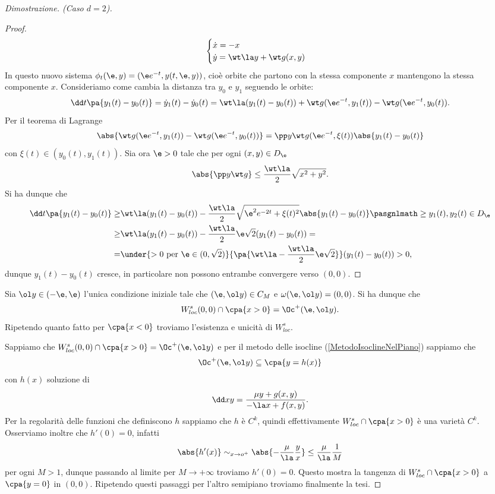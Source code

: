 \begin{proof}[Dimostrazione. (Caso $d=2$)]
\begin{proof}
\[\begin{cases}
\dot x=-x\\
\dot y=\wt \la y+\wt g(x,y)
\end{cases}\]
In questo nuovo sistema $\phi_t(\e,y)=(\e e^{-t},y(t,\e,y))$, cio\`e orbite che partono con la stessa componente $x$ mantengono la stessa componente $x$. Consideriamo come cambia la distanza tra $y_0$ e $y_1$ seguendo le orbite:
\[\dd t{}\pa{y_1(t)-y_0(t)}=\dot y_1(t)-\dot y_0(t)=\wt \la(y_1(t)-y_0(t))+\wt g(\e e^{-t},y_1(t))-\wt g(\e e^{-t},y_0(t)).\]
Per il teorema di Lagrange
\[\abs{\wt g(\e e^{-t},y_1(t))-\wt g(\e e^{-t},y_0(t))}= \pp y{\wt g}(\e e^{-t},\xi(t))\abs{y_1(t)-y_0(t)}\]
con $\xi(t)\in (y_0(t),y_1(t))$. 
Sia ora $\e>0$ tale che per ogni $(x,y)\in D_\e$
\[\abs{\pp y{\wt g}}\leq \frac{\wt \la}2\sqrt{x^2+y^2}.\]
Si ha dunque che
\begin{align*}
\dd t{}\pa{y_1(t)-y_0(t)}\geq& \wt \la(y_1(t)-y_0(t))-\frac{\wt \la}2\sqrt{\e^2e^{-2t}+\xi(t)^2}\abs{y_1(t)-y_0(t)}\pasgnlmath\geq{y_1(t),y_2(t)\in D_\e}\\
\geq& \wt \la(y_1(t)-y_0(t))-\frac{\wt \la}2\e \sqrt 2 (y_1(t)-y_0(t))=\\
=&\under{>0\text{ per }\e\in(0,\sqrt 2)}{\pa{\wt \la-\frac{\wt \la}2\e\sqrt 2}}(y_1(t)-y_0(t))>0,
\end{align*}
dunque $y_1(t)-y_0(t)$ cresce, in particolare non possono entrambe convergere verso $(0,0)$.
\end{proof}
\noindent
Sia $\ol y\in(-\e,\e)$ l'unica condizione iniziale tale che $(\e,\ol y)\in C_M$ e $\omega(\e,\ol y)=(0,0)$. Si ha dunque che 
\[W^s_{loc}(0,0)\cap \cpa{x>0}=\Oc^+(\e,\ol y).\]
Ripetendo quanto fatto per $\cpa{x<0}$ troviamo l'esistenza e unicit\`a di $W^s_{loc}$.
\vspace{0.5cm}

\noindent Sappiamo che $W^s_{loc}(0,0)\cap \cpa{x>0}=\Oc^+(\e,\ol y)$ e per il metodo delle isocline (\ref{MetodoIsoclineNelPiano}) sappiamo che
\[\Oc^+(\e,\ol y)\subseteq \cpa{y=h(x)}\]
con $h(x)$ soluzione di
\[\dd xy=\frac{\mu y+g(x,y)}{-\la x+f(x,y)}.\]
Per la regolarit\`a delle funzioni che definiscono $h$ sappiamo che $h$ \`e $C^k$, quindi effettivamente $W^s_{loc}\cap \cpa{x>0}$ \`e una variet\`a $C^k$.\\
Osserviamo inoltre che $h'(0)=0$, infatti
\[\abs{h'(x)}\sim_{x\to o^+}\abs{-\frac \mu\la\frac yx}\leq \frac\mu\la\frac1M\]
per ogni $M>1$, dunque passando al limite per $M\to+\infty$ troviamo $h'(0)=0$. Questo mostra la tangenza di $W^s_{loc}\cap \cpa{x>0}$ a $\cpa{y=0}$ in $(0,0)$. Ripetendo questi passaggi per l'altro semipiano troviamo finalmente la tesi. 
\end{proof}

